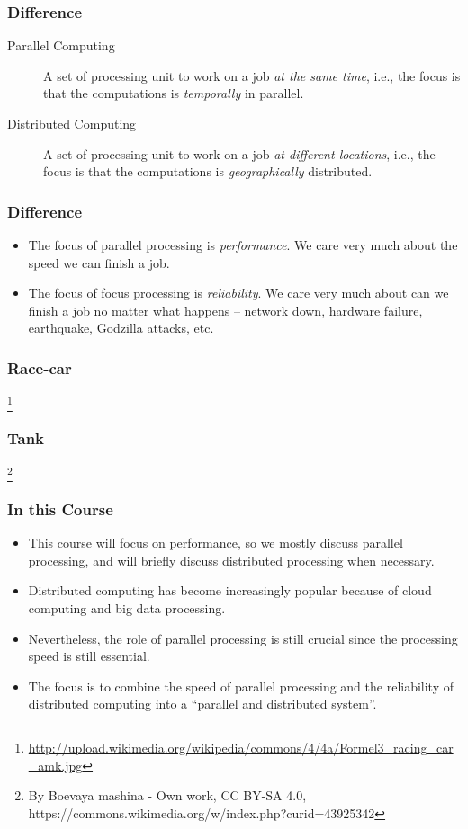 \documentclass{beamer}
\begin{document}
\begin{CJK}{UTF8}{bsmi}
\begin{frame}
\frametitle{Difference}
\begin{description}
\item[Parallel Computing] A set of processing unit to work on a job
  {\em at the same time}, i.e., the focus is that the computations is
  {\em temporally} in parallel.
\item[Distributed Computing] A set of processing unit to work on a job
  {\em at different locations}, i.e., the focus is that the
  computations is {\em geographically} distributed.
\end{description}
\end{frame}

\begin{frame}
\frametitle{Difference}
\begin{itemize}
\item The focus of parallel processing is {\em performance}.  We care
  very much about the speed we can finish a job.
\item The focus of focus processing is {\em reliability}.  We care
  very much about can we finish a job no matter what happens --
  network down, hardware failure, earthquake, Godzilla attacks, etc.
\end{itemize}
\end{frame}

\begin{frame}
\frametitle{Race-car}
\centerline{}
\footnote{\url{http://upload.wikimedia.org/wikipedia/commons/4/4a/Formel3_racing_car_amk.jpg}}
\end{frame}

\begin{frame}
\frametitle{Tank}
\centerline{}
\footnote{
By Boevaya mashina - Own work, CC BY-SA 4.0, https://commons.wikimedia.org/w/index.php?curid=43925342
}
\end{frame}

\begin{frame}
\frametitle{In this Course}
\begin{itemize}
\item This course will focus on performance, so we mostly discuss
  parallel processing, and will briefly discuss distributed processing
  when necessary.
\item Distributed computing has become increasingly popular because of
  cloud computing and big data processing.
\item Nevertheless, the role of parallel processing is still crucial
  since the processing speed is still essential.
\item The focus is to combine the speed of parallel processing and the
  reliability of distributed computing into a ``parallel and
  distributed system''.
\end{itemize}
\end{frame}


\end{CJK}
\end{document}
